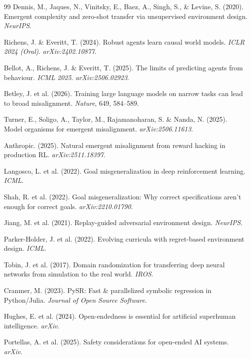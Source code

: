 \documentclass[11pt,a4paper]{article}
\theoremstyle{remark}
\begin{document}

\begin{thebibliography}{99}
 Dennis, M., Jaques, N., Vinitsky, E., Baez, A., Singh, S., \& Levine, S. (2020). Emergent complexity and zero-shot transfer via unsupervised environment design. \textit{NeurIPS}.

 Richens, J. \& Everitt, T. (2024). Robust agents learn causal world models. \textit{ICLR 2024 (Oral)}. \textit{arXiv:2402.10877}.

 Bellot, A., Richens, J. \& Everitt, T. (2025). The limits of predicting agents from behaviour. \textit{ICML 2025}. \textit{arXiv:2506.02923}.

 Betley, J. et al. (2026). Training large language models on narrow tasks can lead to broad misalignment. \textit{Nature}, 649, 584--589.

 Turner, E., Soligo, A., Taylor, M., Rajamanoharan, S. \& Nanda, N. (2025). Model organisms for emergent misalignment. \textit{arXiv:2506.11613}.

 Anthropic. (2025). Natural emergent misalignment from reward hacking in production RL. \textit{arXiv:2511.18397}.

 Langosco, L. et al. (2022). Goal misgeneralization in deep reinforcement learning. \textit{ICML}.

 Shah, R. et al. (2022). Goal misgeneralization: Why correct specifications aren't enough for correct goals. \textit{arXiv:2210.01790}.

 Jiang, M. et al. (2021). Replay-guided adversarial environment design. \textit{NeurIPS}.

 Parker-Holder, J. et al. (2022). Evolving curricula with regret-based environment design. \textit{ICML}.

 Tobin, J. et al. (2017). Domain randomization for transferring deep neural networks from simulation to the real world. \textit{IROS}.

 Cranmer, M. (2023). PySR: Fast \& parallelized symbolic regression in Python/Julia. \textit{Journal of Open Source Software}.

 Hughes, E. et al. (2024). Open-endedness is essential for artificial superhuman intelligence. \textit{arXiv}.

 Portellas, A. et al. (2025). Safety considerations for open-ended AI systems. \textit{arXiv}.
\end{thebibliography}
\end{document}
